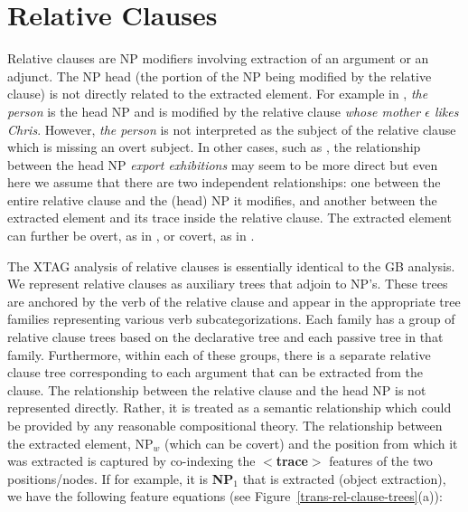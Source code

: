 \chapter{Relative Clauses}
\label{rel_clauses}

Relative clauses are NP modifiers involving extraction of an argument or an
adjunct. The NP head (the portion of the NP being modified by the relative
clause) is not directly related to the extracted element.  For example in
, {\it the person} is the head NP and is modified by the relative
clause {\it whose mother $\epsilon$ likes Chris}. However, {\em the person}
is not interpreted as the subject of the relative clause which is missing
an overt subject. In other cases, such as , the relationship between
the head NP {\em export exhibitions} may seem to be more direct but even
here we assume that there are two independent relationships: one between
the entire relative clause and the (head) NP it modifies, and another
between the extracted element and its trace inside the relative clause. The
extracted element can further be overt, as in , or covert, as in . 


The XTAG analysis of relative clauses is essentially identical to the GB
analysis. We represent relative clauses as auxiliary trees that adjoin to
NP's. These trees are anchored by the verb of the relative clause and
appear in the appropriate tree families representing various verb
subcategorizations. Each family has a group of relative clause trees based
on the declarative tree and each passive tree in that family. Furthermore,
within each of these groups, there is a separate relative clause tree
corresponding to each argument that can be extracted from the clause. The
relationship between the relative clause and the head NP is not represented
directly. Rather, it is treated as a semantic relationship which could be
provided by any reasonable compositional theory. The relationship between
the extracted element, NP$_w$ (which can be covert) and the position from
which it was extracted is captured by co-indexing the {\bf $<$trace$>$}
features of the two positions/nodes. If for example, it is {\bf NP$_{1}$}
that is extracted (object extraction), we have the following feature
equations (see Figure~\ref{trans-rel-clause-trees}(a)):

